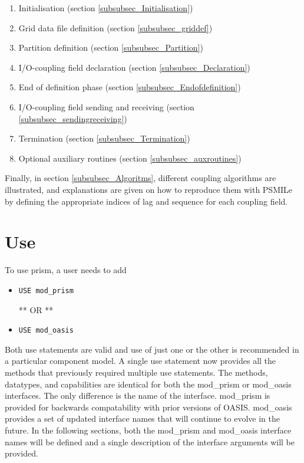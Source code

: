 \begin{enumerate}
\item Initialisation (section \ref{subsubsec_Initialisation})
\item Grid data file definition (section \ref{subsubsec_griddef})
\item Partition definition (section \ref{subsubsec_Partition})
\item I/O-coupling field declaration (section \ref{subsubsec_Declaration})
\item End of definition phase (section \ref{subsubsec_Endofdefinition})
\item I/O-coupling field sending and receiving (section
\ref{subsubsec_sendingreceiving})
\item Termination (section \ref{subsubsec_Termination})
\item Optional auxiliary routines (section \ref{subsubsec_auxroutines})
\end{enumerate}

Finally, in section \ref{subsubsec_Algoritms}, different coupling
algorithms are illustrated, and explanations are given on how to
reproduce them with PSMILe by defining the appropriate indices of
lag and sequence for each coupling field.

\section{Use}
\label{subsubsec_Use}

To use prism, a user needs to add 

\begin{itemize}

\item {\tt USE mod\_prism}

 ** OR **

\item {\tt USE mod\_oasis}
 
\end{itemize}

Both use statements are valid and use of just one or the other
is recommended in a particular component model.  
A single use statement now provides all the methods
that previously required multiple use statements.  The 
methods, datatypes, and capabilities are identical for both the
mod\_prism or mod\_oasis interfaces.  The only difference is the name
of the interface.  mod\_prism is provided
for backwards compatability with prior versions of OASIS.  mod\_oasis
provides a set of updated interface names that will continue to evolve
in the future.  In the following sections, both the mod\_prism
and mod\_oasis interface names will be defined and a single description
of the interface arguments will be provided.

